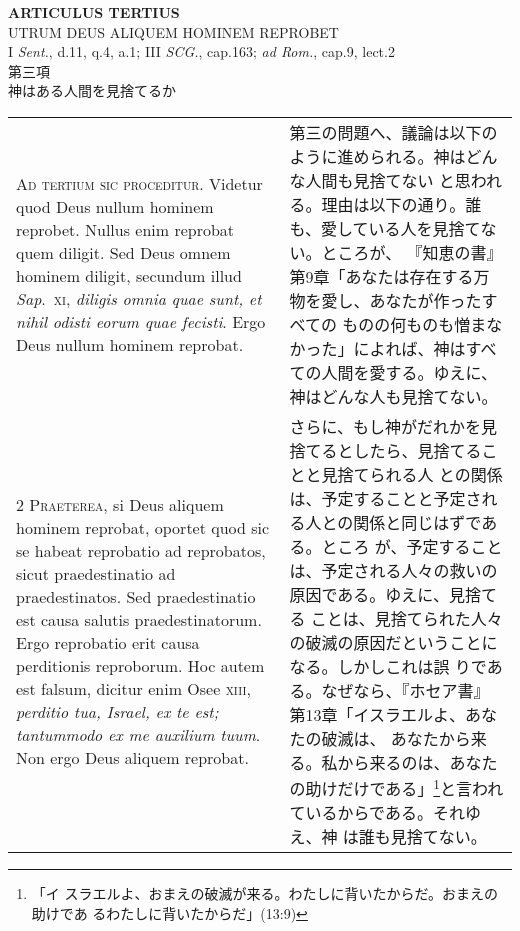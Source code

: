 \documentclass[10pt]{jsarticle} %
\begin{document}
\begin{center}
 {\Large {\bf ARTICULUS TERTIUS}}\\
 {\large UTRUM DEUS ALIQUEM HOMINEM REPROBET}\\
 {\footnotesize I {\itshape Sent.}, d.11, q.4, a.1; III {\itshape SCG.},
 cap.163; {\itshape ad Rom.}, cap.9, lect.2}\\
 {\Large 第三項\\神はある人間を見捨てるか}
\end{center}

\begin{longtable}{p{21em}p{21em}}

{\Huge A}{\scshape d tertium sic proceditur}. Videtur quod
Deus nullum hominem reprobet. Nullus enim reprobat quem diligit. Sed
Deus omnem hominem diligit, secundum illud {\itshape Sap}.~{\scshape xi}, {\itshape diligis omnia quae
sunt, et nihil odisti eorum quae fecisti}. Ergo Deus nullum hominem
reprobat.


&

第三の問題へ、議論は以下のように進められる。神はどんな人間も見捨てない
と思われる。理由は以下の通り。誰も、愛している人を見捨てない。ところが、
『知恵の書』第9章「あなたは存在する万物を愛し、あなたが作ったすべての
ものの何ものも憎まなかった」によれば、神はすべての人間を愛する。ゆえに、
神はどんな人も見捨てない。
 

 
\\


{\scshape 2 Praeterea}, si Deus aliquem hominem
reprobat, oportet quod sic se habeat reprobatio ad reprobatos, sicut
praedestinatio ad praedestinatos. Sed praedestinatio est causa salutis
praedestinatorum. Ergo reprobatio erit causa perditionis reproborum. Hoc
autem est falsum, dicitur enim Osee {\scshape xiii}, {\itshape perditio tua, Israel, ex te
 est; tantummodo ex me auxilium tuum}. Non ergo Deus aliquem reprobat.

 &

さらに、もし神がだれかを見捨てるとしたら、見捨てることと見捨てられる人
との関係は、予定することと予定される人との関係と同じはずである。ところ
が、予定することは、予定される人々の救いの原因である。ゆえに、見捨てる
ことは、見捨てられた人々の破滅の原因だということになる。しかしこれは誤
りである。なぜなら、『ホセア書』第13章「イスラエルよ、あなたの破滅は、
あなたから来る。私から来るのは、あなたの助けだけである」\footnote{「イ
スラエルよ、おまえの破滅が来る。わたしに背いたからだ。おまえの助けであ
るわたしに背いたからだ」(13:9)}と言われているからである。それゆえ、神
は誰も見捨てない。
 

\end{longtable}
\end{document}

